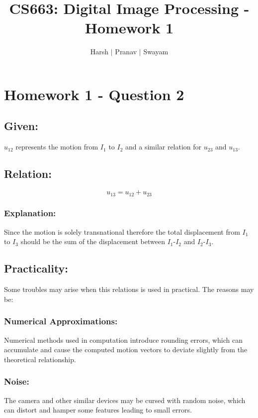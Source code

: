 \documentclass{article}
\title{CS663: Digital Image Processing - Homework 1}
\author{Harsh $\vert$ Pranav $\vert$ Swayam}
\begin{document}
\maketitle
\section{Homework 1 - Question 2}


\subsection*{Given:}

$u_{12}$ represents the motion from $I_1$ to $I_2$ and a similar relation for $u_{23}$ and $u_{13}$.

\subsection*{Relation:}
$$u_{13}=u_{12}+u_{23}$$


\subsubsection*{Explanation:} 

Since the motion is solely transnational therefore the total displacement from $I_1$ to $I_3$ should be the sum of the displacement between $I_1$-$I_2$ and $I_2$-$I_3$.


\subsection*{Practicality:}


Some troubles may arise when this relations is used in practical. The reasons may be:


\subsubsection*{Numerical Approximations:} 

Numerical methods used in computation introduce rounding errors, which can accumulate and cause the computed motion vectors to deviate slightly from the theoretical relationship.


\subsubsection*{Noise:} 

The camera and other similar devices may be cursed with random noise, which can distort and hamper some features leading to small errors.
\end{document}
